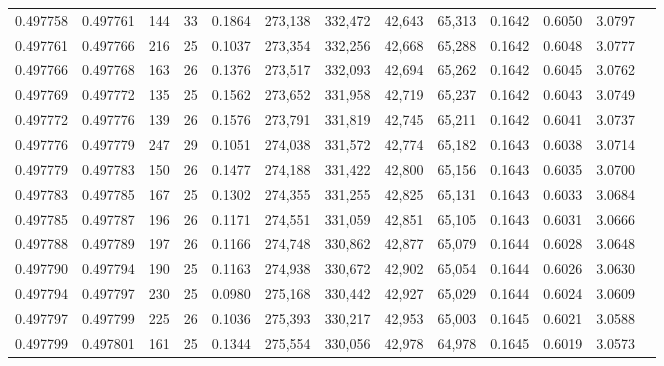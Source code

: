 \begin{tabular}{rrrrrrrrrrrrr}
0.497758 & 0.497761 & 144 &  33 &                                     0.1864 & 273,138 & 332,472 &  42,643 &  65,313 & 0.1642 & 0.6050 & 3.0797 \\
0.497761 & 0.497766 & 216 &  25 &                                     0.1037 & 273,354 & 332,256 &  42,668 &  65,288 & 0.1642 & 0.6048 & 3.0777 \\
0.497766 & 0.497768 & 163 &  26 &                                     0.1376 & 273,517 & 332,093 &  42,694 &  65,262 & 0.1642 & 0.6045 & 3.0762 \\
0.497769 & 0.497772 & 135 &  25 &                                     0.1562 & 273,652 & 331,958 &  42,719 &  65,237 & 0.1642 & 0.6043 & 3.0749 \\
0.497772 & 0.497776 & 139 &  26 &                                     0.1576 & 273,791 & 331,819 &  42,745 &  65,211 & 0.1642 & 0.6041 & 3.0737 \\
0.497776 & 0.497779 & 247 &  29 &                                     0.1051 & 274,038 & 331,572 &  42,774 &  65,182 & 0.1643 & 0.6038 & 3.0714 \\
0.497779 & 0.497783 & 150 &  26 &                                     0.1477 & 274,188 & 331,422 &  42,800 &  65,156 & 0.1643 & 0.6035 & 3.0700 \\
0.497783 & 0.497785 & 167 &  25 &                                     0.1302 & 274,355 & 331,255 &  42,825 &  65,131 & 0.1643 & 0.6033 & 3.0684 \\
0.497785 & 0.497787 & 196 &  26 &                                     0.1171 & 274,551 & 331,059 &  42,851 &  65,105 & 0.1643 & 0.6031 & 3.0666 \\
0.497788 & 0.497789 & 197 &  26 &                                     0.1166 & 274,748 & 330,862 &  42,877 &  65,079 & 0.1644 & 0.6028 & 3.0648 \\
0.497790 & 0.497794 & 190 &  25 &                                     0.1163 & 274,938 & 330,672 &  42,902 &  65,054 & 0.1644 & 0.6026 & 3.0630 \\
0.497794 & 0.497797 & 230 &  25 &                                     0.0980 & 275,168 & 330,442 &  42,927 &  65,029 & 0.1644 & 0.6024 & 3.0609 \\
0.497797 & 0.497799 & 225 &  26 &                                     0.1036 & 275,393 & 330,217 &  42,953 &  65,003 & 0.1645 & 0.6021 & 3.0588 \\
0.497799 & 0.497801 & 161 &  25 &                                     0.1344 & 275,554 & 330,056 &  42,978 &  64,978 & 0.1645 & 0.6019 & 3.0573 \\

\end{tabular}
